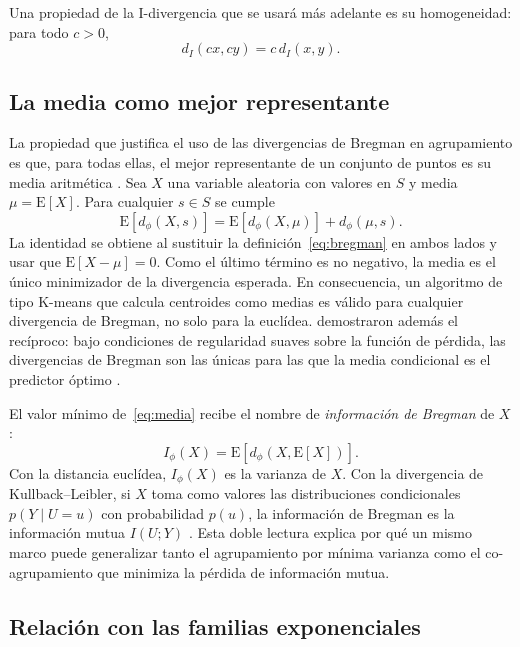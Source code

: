 Una propiedad de la I-divergencia que se usará más adelante es su homogeneidad:
para todo $c > 0$,
\begin{equation}\label{eq:homogeneidad}
  d_I(cx, cy) = c \, d_I(x, y).
\end{equation}

\subsection{La media como mejor representante}

La propiedad que justifica el uso de las divergencias de Bregman en agrupamiento
es que, para todas ellas, el mejor representante de un conjunto de puntos es su
media aritmética \cite[Prop.~1]{Banerjee2005}. Sea $X$ una variable aleatoria con
valores en $S$ y media $\mu = \mathrm{E}[X]$. Para cualquier $s \in S$ se cumple
\begin{equation}\label{eq:media}
  \mathrm{E}[d_\phi(X, s)] = \mathrm{E}[d_\phi(X, \mu)] + d_\phi(\mu, s).
\end{equation}
La identidad se obtiene al sustituir la definición~\eqref{eq:bregman} en ambos
lados y usar que $\mathrm{E}[X - \mu] = 0$. Como el último término es no negativo,
la media es el único minimizador de la divergencia esperada. En consecuencia, un
algoritmo de tipo K-means que calcula centroides como medias es válido para
cualquier divergencia de Bregman, no solo para la euclídea.
\cite{Banerjee2005opt} demostraron además el recíproco: bajo condiciones de
regularidad suaves sobre la función de pérdida, las divergencias de Bregman son
las únicas para las que la media condicional es el predictor óptimo
\cite[Teoremas~3 y~4]{Banerjee2005opt}.

El valor mínimo de~\eqref{eq:media} recibe el nombre de \emph{información de
Bregman} de $X$:
\begin{equation}\label{eq:info-bregman}
  I_\phi(X) = \mathrm{E}[d_\phi(X, \mathrm{E}[X])].
\end{equation}
Con la distancia euclídea, $I_\phi(X)$ es la varianza de $X$. Con la divergencia de
Kullback--Leibler, si $X$ toma como valores las distribuciones condicionales
$p(Y \mid U = u)$ con probabilidad $p(u)$, la información de Bregman es la
información mutua $I(U;Y)$ \cite{Banerjee2005}. Esta doble lectura explica por qué
un mismo marco puede generalizar tanto el agrupamiento por mínima varianza como el
co-agrupamiento que minimiza la pérdida de información mutua.

\subsection{Relación con las familias exponenciales}\label{sec:bregman-expfam}

